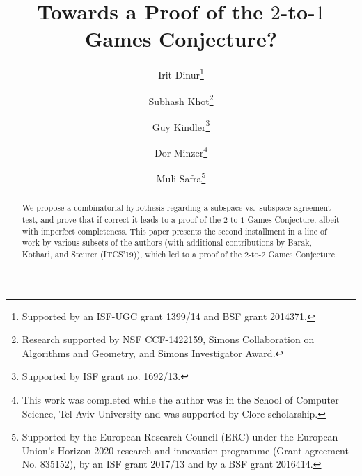 \documentclass{toc}
\begin{document}
\begin{frontmatter}%

%
%
%

%
\title{Towards a Proof of the $2$-to-$1$ Games Conjecture?}  %

%
%

%
%
%
%
%
%

%
%
%
%
%
%
%
%
%
%
%
%


%
%
%
%

%

\author[dinur]{Irit Dinur\thanks{Supported by an ISF-UGC grant 1399/14 and BSF grant 2014371.}}
\author[khot]{Subhash Khot\thanks{Research
supported by NSF CCF-1422159, Simons Collaboration on Algorithms and Geometry, and Simons Investigator Award.}}
%
\author[kindler]{Guy Kindler\thanks{Supported by ISF grant no. 1692/13.}}
\author[minzer]{Dor Minzer\thanks{This work was completed while the author was in the School of Computer Science, Tel Aviv University
and was supported by Clore scholarship.}}
\author[safra]{Muli Safra\thanks{Supported by the European Research Council (ERC) under the European Union’s Horizon 2020 research and innovation programme (Grant agreement No. 835152),
by an ISF grant 2017/13 and by a BSF grant 2016414.}}

%
%
%
%

%
%
%
%
%
%
%
%
\begin{abstract}
  We propose a combinatorial hypothesis regarding a subspace vs.\ subspace
agreement test, and prove that if correct it leads to a proof of
 the $2$-to-$1$ Games Conjecture, albeit with imperfect completeness.
 This %
 paper  %
 presents the second installment in a line of work
%
%
 by various subsets of the authors %
 (with additional contributions %
 by Barak, Kothari, and Steurer (ITCS'19)),  %
 which led to a proof of the $2$-to-$2$ Games Conjecture.
%
%
%
\end{abstract}

%

\end{frontmatter}

%
%
%
\end{document}
